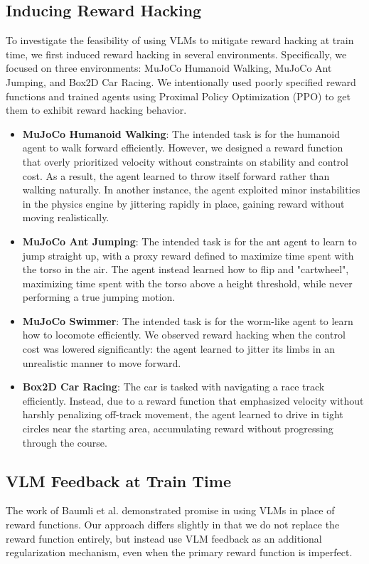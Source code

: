 \documentclass{article}
\begin{document}
\subsection{Inducing Reward Hacking}
To investigate the feasibility of using VLMs to mitigate reward hacking at train time, we first induced reward hacking in several environments. Specifically, we focused on three environments: MuJoCo Humanoid Walking, MuJoCo Ant Jumping, and Box2D Car Racing. We intentionally used poorly specified reward functions and trained agents using Proximal Policy Optimization (PPO) to get them to exhibit reward hacking behavior.

\begin{itemize}
\item \textbf{MuJoCo Humanoid Walking}: The intended task is for the humanoid agent to walk forward efficiently. However, we designed a reward function that overly prioritized velocity without constraints on stability and control cost. As a result, the agent learned to throw itself forward rather than walking naturally. In another instance, the agent exploited minor instabilities in the physics engine by jittering rapidly in place, gaining reward without moving realistically.

\item \textbf{MuJoCo Ant Jumping}: The intended task is for the ant agent to learn to jump straight up, with a proxy reward defined to maximize time spent with the torso in the air. The agent instead learned how to flip and "cartwheel", maximizing time spent with the torso above a height threshold, while never performing a true jumping motion.

\item \textbf{MuJoCo Swimmer}: The intended task is for the worm-like agent to learn how to locomote efficiently. We observed reward hacking when the control cost was lowered significantly: the agent learned to jitter its limbs in an unrealistic manner to move forward.

\item \textbf{Box2D Car Racing}: The car is tasked with navigating a race track efficiently. Instead, due to a reward function that emphasized velocity without harshly penalizing off-track movement, the agent learned to drive in tight circles near the starting area, accumulating reward without progressing through the course.
\end{itemize}

\subsection{VLM Feedback at Train Time}
The work of Baumli et al. \cite{baumli2024visionlanguagemodelssourcerewards} demonstrated promise in using VLMs in place of reward functions. Our approach differs slightly in that we do not replace the reward function entirely, but instead use VLM feedback as an additional regularization mechanism, even when the primary reward function is imperfect.
\end{document}
